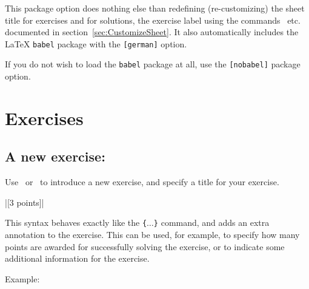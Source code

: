 \documentclass[11pt,a4paper]{article}
\begin{document}
\begin{pkgtip}
  This package option does nothing else than redefining (re-customizing) the sheet title
  for exercises and for solutions, the exercise label using the
  commands~ etc. documented in
  section~\ref{sec:CustomizeSheet}. It also automatically includes the \LaTeX{}
  \texttt{babel} package with the \texttt{[german]} option.
\end{pkgtip}


\begin{pkgtip}
  If you do not wish to load the \texttt{babel} package at all, use the \texttt{[nobabel]}
  package option.
\end{pkgtip}




\section{Exercises}

\subsection{A new exercise: }

Use~ or~ to introduce a new exercise, and specify a
title for your exercise.

\verbdef\exampleuebungannotation|[3 points]|
%\def\uebungannotprototype{\{$\langle$Exercise %
{%
\def\uebdocNoLabel{}%
%
{ This syntax behaves exactly like the \texttt{\{$\ldots$\}} command, and
  adds an extra annotation to the exercise. This can be used, for example, to specify how
  many points are awarded for successfully solving the exercise, or to indicate some
  additional information for the exercise.

  Example: \exampleuebungannotation
}
}
\end{document}
